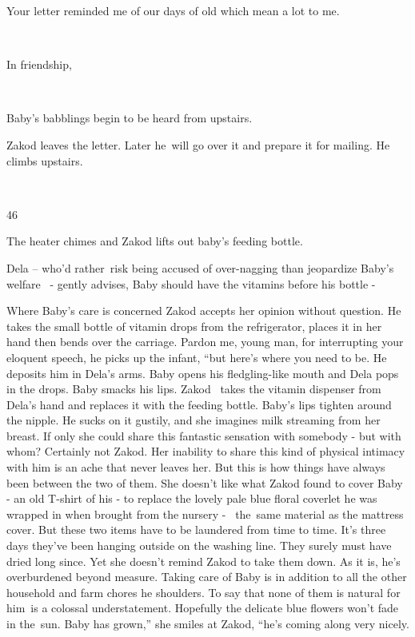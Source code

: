 \documentclass[12pt]{book}
\begin{document}
Your letter reminded me of our days of old which mean a lot to me.

~

In friendship,

~

Baby's babblings begin to be heard from upstairs.~~~~~~

Zakod leaves the letter. Later he~will go over it and prepare it for mailing. He climbs upstairs.

~

46

The heater chimes and Zakod lifts out baby's feeding bottle.

Dela -- who'd rather~risk being accused of over-nagging than jeopardize Baby's welfare ~- gently advises,
{\textquotedbl}Baby should have the vitamins before his bottle -{\textquotedbl}

Where Baby's care is concerned Zakod accepts her opinion without question. He takes the small bottle of vitamin drops
from the refrigerator, places it in her hand then bends over the carriage. {\textquotedbl}Pardon me, young man, for
interrupting your eloquent speech,{\textquotedbl} he picks up the infant, ``but here's where you need to
be.{\textquotedbl} He deposits him in Dela's arms. Baby opens his fledgling-like mouth and Dela pops in the drops. Baby
smacks his lips. Zakod \ takes the vitamin dispenser from Dela's hand and replaces it with the feeding bottle. Baby's
lips tighten around the nipple. He sucks on it gustily, and she imagines milk streaming from her breast. If only she
could share this fantastic sensation with somebody - but with whom? Certainly not Zakod. Her inability to share this
kind of physical intimacy with him is an ache that never leaves her. But this is how things have always been between
the two of them. She doesn't like what Zakod found to cover Baby - an old T-shirt of his - to replace the lovely pale
blue floral coverlet he was wrapped in when brought from the nursery - \ the~same material as the mattress cover. But
these two items have to be laundered from time to time. It's three days they've been hanging outside on the washing
line. They surely must have dried long since. Yet she doesn't remind Zakod to take them down. As it is, he's
overburdened beyond measure. Taking care of Baby is in addition to all the other household and farm chores he
shoulders. To say that none of them is natural for him~is a colossal understatement. Hopefully the delicate blue
flowers won't fade in the~sun. {\textquotedbl}Baby has grown,'' she smiles at Zakod, ``he's coming along very
nicely.{\textquotedbl}
\end{document}
